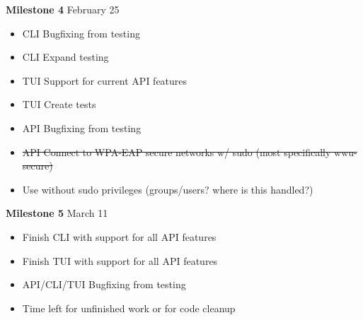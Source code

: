 \documentclass[11pt]{article}
\begin{document}
\textbf{Milestone 4} February 25
\begin{itemize}
  \item CLI Bugfixing from testing
  \item CLI Expand testing
  \item TUI Support for current API features
  \item TUI Create tests
  \item API Bugfixing from testing
  \item\sout{API Connect to WPA-EAP secure networks w/ sudo (most specifically wwu-secure)}
  \item Use without sudo privileges (groups/users? where is this handled?)
\end{itemize}

\textbf{Milestone 5} March 11
\begin{itemize}
  \item Finish CLI with support for all API features
  \item Finish TUI with support for all API features
  \item API/CLI/TUI Bugfixing from testing
  \item Time left for unfinished work or for code cleanup
\end{itemize}
\end{document}

